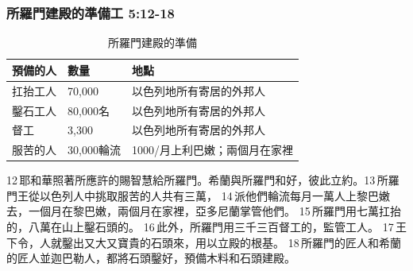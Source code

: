 \subsubsection{所羅門建殿的準備工 5:12-18}
\begin{table}\vspace*{-10mm}
\centering
\begin{tabular}{p{1.5cm}|p{2cm}|p{5.4cm}}\hline\hline
預備的人&數量 &地點　\\\hline\hline
扛抬工人    &70,000    &以色列地所有寄居的外邦人 \\\hline
鑿石工人  &80,000名 &以色列地所有寄居的外邦人 \\\hline
督工          &3,300    &以色列地所有寄居的外邦人  \\\hline
服苦的人 &30,000輪流 &1000/月上利巴嫩；兩個月在家裡\\\hline
\end{tabular}
\caption{所羅門建殿的準備}
\end{table}
12 耶和華照著所應許的賜智慧給所羅門。希蘭與所羅門和好，彼此立約。13 所羅門王從以色列人中挑取服苦的人共有三萬， 14 派他們輪流每月一萬人上黎巴嫩去，一個月在黎巴嫩，兩個月在家裡，亞多尼蘭掌管他們。 15 所羅門用七萬扛抬的，八萬在山上鑿石頭的。 16 此外，所羅門用三千三百督工的，監管工人。 17 王下令，人就鑿出又大又寶貴的石頭來，用以立殿的根基。 18 所羅門的匠人和希蘭的匠人並迦巴勒人，都將石頭鑿好，預備木料和石頭建殿。

